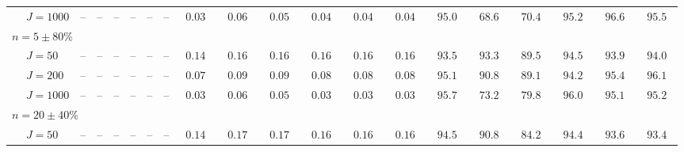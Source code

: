 \begin{sidewaystable}
\begin{threeparttable}
\begin{tabular}{llcccccccccccccccccc}
 & \nopagebreak $\;J=1000$  & \phantom{00}--\phantom{00} & \phantom{00}--\phantom{00} & \phantom{00}--\phantom{00} & \phantom{00}--\phantom{00} & \phantom{00}--\phantom{00} & \phantom{00}--\phantom{00} & $\phantom{0}0.03\phantom{0}$ & $\phantom{0}0.06\phantom{0}$ & $\phantom{0}0.05\phantom{0}$ & $\phantom{0}0.04\phantom{0}$ & $\phantom{0}0.04\phantom{0}$ & $\phantom{0}0.04\phantom{0}$ & $\phantom{0}95.0\phantom{0}$ & $\phantom{0}68.6\phantom{0}$ & $\phantom{0}70.4\phantom{0}$ & $\phantom{0}95.2\phantom{0}$ & $\phantom{0}96.6\phantom{0}$ & $\phantom{0}95.5\phantom{0}$ \\
\multicolumn{4}{l}{$n=5\pm80\%$ } \\  & \nopagebreak $\;J=50$  & \phantom{00}--\phantom{00} & \phantom{00}--\phantom{00} & \phantom{00}--\phantom{00} & \phantom{00}--\phantom{00} & \phantom{00}--\phantom{00} & \phantom{00}--\phantom{00} & $\phantom{0}0.14\phantom{0}$ & $\phantom{0}0.16\phantom{0}$ & $\phantom{0}0.16\phantom{0}$ & $\phantom{0}0.16\phantom{0}$ & $\phantom{0}0.16\phantom{0}$ & $\phantom{0}0.16\phantom{0}$ & $\phantom{0}93.5\phantom{0}$ & $\phantom{0}93.3\phantom{0}$ & $\phantom{0}89.5\phantom{0}$ & $\phantom{0}94.5\phantom{0}$ & $\phantom{0}93.9\phantom{0}$ & $\phantom{0}94.0\phantom{0}$ \\
 & \nopagebreak $\;J=200$  & \phantom{00}--\phantom{00} & \phantom{00}--\phantom{00} & \phantom{00}--\phantom{00} & \phantom{00}--\phantom{00} & \phantom{00}--\phantom{00} & \phantom{00}--\phantom{00} & $\phantom{0}0.07\phantom{0}$ & $\phantom{0}0.09\phantom{0}$ & $\phantom{0}0.09\phantom{0}$ & $\phantom{0}0.08\phantom{0}$ & $\phantom{0}0.08\phantom{0}$ & $\phantom{0}0.08\phantom{0}$ & $\phantom{0}95.1\phantom{0}$ & $\phantom{0}90.8\phantom{0}$ & $\phantom{0}89.1\phantom{0}$ & $\phantom{0}94.2\phantom{0}$ & $\phantom{0}95.4\phantom{0}$ & $\phantom{0}96.1\phantom{0}$ \\
 & \nopagebreak $\;J=1000$  & \phantom{00}--\phantom{00} & \phantom{00}--\phantom{00} & \phantom{00}--\phantom{00} & \phantom{00}--\phantom{00} & \phantom{00}--\phantom{00} & \phantom{00}--\phantom{00} & $\phantom{0}0.03\phantom{0}$ & $\phantom{0}0.06\phantom{0}$ & $\phantom{0}0.05\phantom{0}$ & $\phantom{0}0.03\phantom{0}$ & $\phantom{0}0.03\phantom{0}$ & $\phantom{0}0.03\phantom{0}$ & $\phantom{0}95.7\phantom{0}$ & $\phantom{0}73.2\phantom{0}$ & $\phantom{0}79.8\phantom{0}$ & $\phantom{0}96.0\phantom{0}$ & $\phantom{0}95.1\phantom{0}$ & $\phantom{0}95.2\phantom{0}$ \\
\multicolumn{4}{l}{$n=20\pm40\%$ } \\  & \nopagebreak $\;J=50$  & \phantom{00}--\phantom{00} & \phantom{00}--\phantom{00} & \phantom{00}--\phantom{00} & \phantom{00}--\phantom{00} & \phantom{00}--\phantom{00} & \phantom{00}--\phantom{00} & $\phantom{0}0.14\phantom{0}$ & $\phantom{0}0.17\phantom{0}$ & $\phantom{0}0.17\phantom{0}$ & $\phantom{0}0.16\phantom{0}$ & $\phantom{0}0.16\phantom{0}$ & $\phantom{0}0.16\phantom{0}$ & $\phantom{0}94.5\phantom{0}$ & $\phantom{0}90.8\phantom{0}$ & $\phantom{0}84.2\phantom{0}$ & $\phantom{0}94.4\phantom{0}$ & $\phantom{0}93.6\phantom{0}$ & $\phantom{0}93.4\phantom{0}$ \\

\end{tabular}
\end{threeparttable}
\end{sidewaystable}
